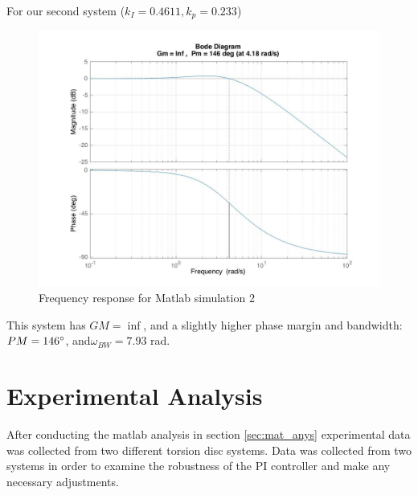 \documentclass[11pt,titlepage]{article}
\begin{document}
    For our second system ($k_I=0.4611, k_p=0.233$) 
    \begin{figure}[H]
        \centering
        \includegraphics[scale=.3]{Hyr_freq2_bode}
        \caption{Frequency response for Matlab simulation 2}
        \label{fig:Hyr_freq2_bode}
    \end{figure} 
    This system has $GM=\inf$, and a slightly higher phase margin and bandwidth: $PM=146\degree$, and$\omega_{BW}=7.93$ rad. 
	 
\section{Experimental Analysis}
    After conducting the matlab analysis in section \ref{sec:mat_anys} experimental data was collected from two different torsion disc systems. Data was collected from two systems in order to examine the robustness of the PI controller and make any necessary adjustments.
\end{document}
